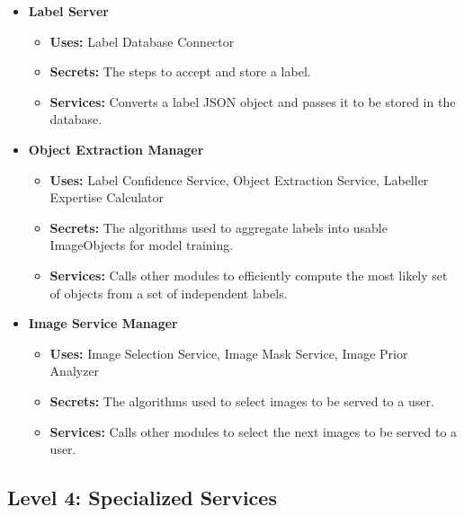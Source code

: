 \documentclass[12pt, titlepage]{article}
\begin{document}
\begin{itemize}
    \item \textbf{Label Server}
    \begin{itemize}
        \item \textbf{Uses:} Label Database Connector
        \item \textbf{Secrets:} The steps to accept and store a label.
        \item \textbf{Services:} Converts a label JSON object and passes it to be stored in the database.
    \end{itemize}
    \item \textbf{Object Extraction Manager}
    \begin{itemize}
        \item \textbf{Uses:} Label Confidence Service, Object Extraction Service, Labeller Expertise Calculator
        \item \textbf{Secrets:} The algorithms used to aggregate labels into usable ImageObjects for model training.
        \item \textbf{Services:} Calls other modules to efficiently compute the most likely set of objects from a set of independent labels.
    \end{itemize}
    \item \textbf{Image Service Manager}
    \begin{itemize}
        \item \textbf{Uses:} Image Selection Service, Image Mask Service, Image Prior Analyzer
        \item \textbf{Secrets:} The algorithms used to select images to be served to a user.
        \item \textbf{Services:} Calls other modules to select the next images to be served to a user.
    \end{itemize}
\end{itemize}

\subsection*{Level 4: Specialized Services}
\end{document}
